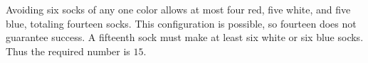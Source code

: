 Avoiding six socks of any one color allows at most four red, five white, and five blue, totaling fourteen socks. This configuration is possible, so fourteen does not guarantee success. A fifteenth sock must make at least six white or six blue socks. Thus the required number is $\boxed{15}$.
